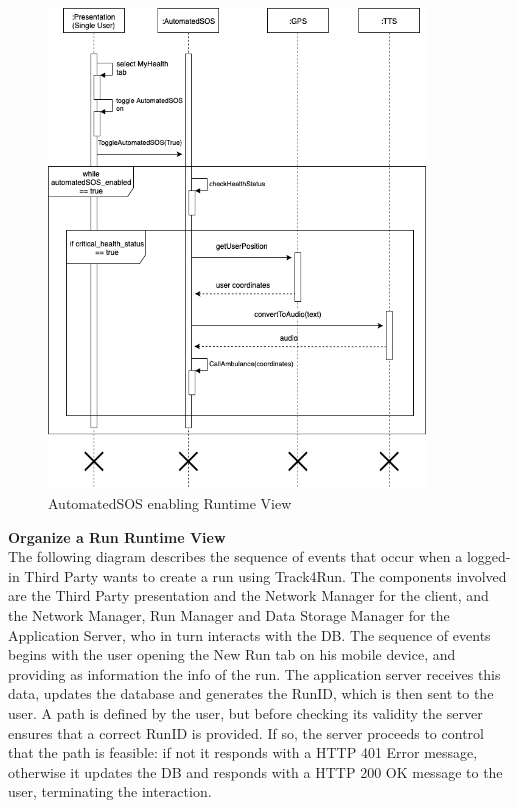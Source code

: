 \documentclass[titlepage]{article}
\begin{document}
\begin{figure}[H]
	\center
  	\includegraphics[width=10cm]{SOS.png} %
  	\caption{AutomatedSOS enabling Runtime View}
 	\label{fig:SOS}
\end{figure}


{\bf Organize a Run Runtime View }\\ 
The following diagram describes the sequence of events that occur when a logged-in Third Party wants to create a run using Track4Run.
The components involved are the Third Party presentation and the Network Manager for the client, and the Network Manager, Run Manager and Data Storage Manager for the Application Server, who in turn interacts with the DB.
The sequence of events begins with the user opening the New Run tab on his mobile device, and providing as information the info of the run. The application server receives this data, updates the database and generates the RunID, which is then sent to the user. A path is defined by the user, but before checking its validity the server ensures that a correct RunID is provided. If so, the server proceeds to control that the path is feasible: if not it responds with a HTTP 401 Error message, otherwise it updates the DB and responds with a HTTP 200 OK message to the user, terminating the interaction.
\end{document}
